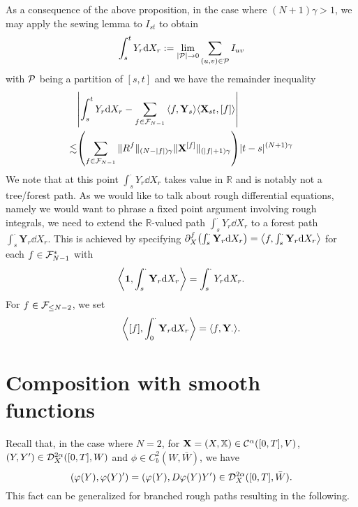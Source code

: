\documentclass[11pt]{style/preprint}
\begin{document}
As a consequence of the above proposition, in the case where \((N + 1) \gamma > 1\), we may apply the sewing 
lemma to \(I_{st}\) to obtain 
\[\int_s^t Y_r \dd X_r := \lim_{|{\mathcal P}| \to 0} \sum_{(u, v) \in {\mathcal P}} I_{uv}\]
with \({\mathcal P}\) being a partition of \([s, t]\) and we have the remainder inequality 
\begin{align*}
  & \left|\int_s^t Y_r \dd X_r - \sum_{f \in \CF_{N - 1}} \< f, \mathbf{Y}_s\> \< \mathbf{X}_{st}, [f]\>\right|\\
  \lesssim & \left(\sum_{f \in \CF_{N - 1}} \|R^f\|_{(N - |f|)\gamma} \|\mathbf{X}^{[f]}\|_{(|f| + 1)\gamma}\right)|t - s|^{(N + 1)\gamma}
\end{align*}
We note that at this point \(\int_s^{\cdot} Y_r \dd X_r\) takes value in \(\mathbb{R}\) and is notably not a tree/forest 
path. As we would like to talk about rough differential equations, namely we would want to phrase a fixed point 
argument involving rough integrals, we need to extend the \(\mathbb{R}\)-valued path \(\int_s^{\cdot} Y_r \dd X_r\) 
to a forest path \(\int_s^{\cdot} \mathbf{Y}_r \dd X_r\). This is achieved by specifying 
\(\partial^f_X \left(\int_s^{\cdot} \mathbf{Y}_r \dd X_r\right) = \< f, \int_s^{\cdot} \mathbf{Y}_r \dd X_r \>\) 
for each \(f \in {\mathcal F}_{N - 1}^*\) with 
\[\< \mathbf{1}, \int_s^{\cdot} \mathbf{Y}_r \dd X_r \> = \int_s^{\cdot} Y_r \dd X_r.\]
For \(f \in {\mathcal F}_{\le N - 2}\), we set 
\[\< [f], \int_0^{\cdot} \mathbf{Y}_r \dd X_r \> = \< f, \mathbf{Y}_{\cdot}\>.\]

\section{Composition with smooth functions}

Recall that, in the case where \(N = 2\), for \(\mathbf{X} = (X, \mathbb{X}) \in {\mathcal C}^{\alpha}([0, T], V)\), 
\((Y, Y') \in {\mathcal D}_X^{2\alpha}([0, T], W)\) and \(\phi \in C^2_b(W, \bar W)\), we have 
\[(\varphi(Y), \varphi(Y)') = (\varphi(Y), D\varphi(Y) Y') \in {\mathcal D}_X^{2\alpha}([0, T], \bar W).\]
This fact can be generalized for branched rough paths resulting in the following.
\end{document}

